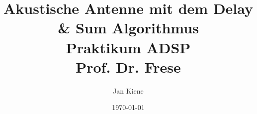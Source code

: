 \documentclass[11pt,a4paper,titlepage,svgnames]{article}
\title{\blueb Akustische Antenne mit dem Delay \& Sum Algorithmus\\
	\blue Praktikum ADSP \\
	\blue Prof. Dr. Frese}
\author{Jan Kiene}
\date{\today}
\begin{document}
	{\let\newpage\relax\maketitle}
	
	\newpage
	\tableofcontents
	\newpage
	
	\newpage
	
	\newpage
	
	\newpage
	
	
	
	
	
\end{document}
